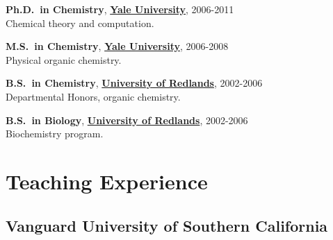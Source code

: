 \documentclass[10pt]{article}
\newcommand*\eduitem[4]{\textbf{#1}, \textbf{#2}, #3\\#4}
\begin{document}

\eduitem{Ph.D.\ in Chemistry}{\href{http://www.yale.edu/}{Yale University}}{2006-2011}
{Chemical theory and computation.} 

\eduitem{M.S.\ in Chemistry}{\href{http://www.yale.edu/}{Yale University}}{2006-2008}
{Physical organic chemistry.} 

\eduitem{B.S.\ in Chemistry}{\href{http://www.redlands.edu/}{University of Redlands}}{2002-2006}
{Departmental Honors, organic chemistry.} 

\eduitem{B.S.\ in Biology}{\href{http://www.redlands.edu/}{University of Redlands}}{2002-2006}
{Biochemistry program.} 


\section{Teaching Experience}


\vspace*{-2mm}  \vspace*{-2mm}


\subsection*{Vanguard University of Southern California}
\end{document}
